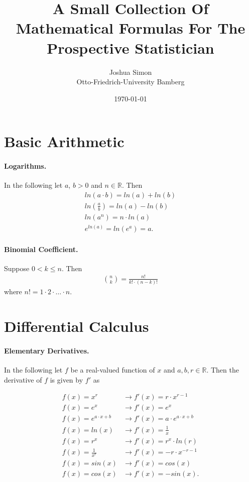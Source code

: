 \documentclass{article}
\title{A Small Collection Of Mathematical Formulas For The 
Prospective Statistician}
\author{Joshua Simon  \\
	Otto-Friedrich-University Bamberg \\
	}
\date{\today}
\begin{document}
\maketitle



\section{Basic Arithmetic}
\paragraph{Logarithms.} In the following let $a$, $b > 0$ and $n \in \mathbb{R}$. Then
\begin{gather*}
    ln(a \cdot b) = ln(a) + ln(b) \\
    ln(\frac{a}{b}) = ln(a) - ln(b) \\
    ln(a^n) = n \cdot ln(a) \\
    e^{ln(a)} = ln(e^{a}) = a.
\end{gather*}

\paragraph{Binomial Coefficient.} Suppose $0 < k \leq n$. Then
\begin{gather*}
    \binom{n}{k} = \frac{n!}{k! \cdot (n-k)!}
\end{gather*}
where $n! = 1 \cdot 2 \cdot \ldots \cdot n$.



\section{Differential Calculus} \label{DifferentialCalculus}
\paragraph{Elementary Derivatives.} In the following let $f$ be a real-valued function of $x$ and $a, b, r \in \mathbb{R}$. Then the derivative of $f$ is given by $f'$ as

\begin{align*}
    f(x) = x^r &\rightarrow f'(x) = r \cdot x^{r - 1} \\
    f(x) = e^x &\rightarrow f'(x) = e^x \\
    f(x) = e^{a \cdot x + b} &\rightarrow f'(x) = a \cdot e^{a \cdot x + b} \\
    f(x) = ln(x) &\rightarrow f'(x) = \frac{1}{x} \\
    f(x) = r^x &\rightarrow f'(x) = r^x \cdot ln(r) \\
    f(x) = \frac{1}{x^r}  &\rightarrow f'(x) = - r \cdot x^{-r - 1} \\
    f(x) = sin(x) &\rightarrow f'(x) = cos(x) \\
    f(x) = cos(x) &\rightarrow f'(x) = - sin(x).
\end{align*}
\end{document}
